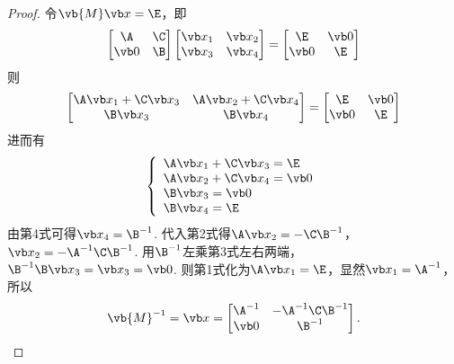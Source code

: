 \begin{example}
\begin{proof}
令\(\vb{M}\x=\E\)，即\[
	\begin{bmatrix}
		\A & \C \\
		\vb0 & \B
	\end{bmatrix}
	\begin{bmatrix}
		\x_1 & \x_2 \\
		\x_3 & \x_4
	\end{bmatrix}
	= \begin{bmatrix}
		\E & \vb0 \\
		\vb0 & \E
	\end{bmatrix}
\]则\[
	\begin{bmatrix}
		\A\x_1+\C\x_3 & \A\x_2+\C\x_4 \\
		\B\x_3 & \B\x_4
	\end{bmatrix}
	= \begin{bmatrix}
		\E & \vb0 \\
		\vb0 & \E
	\end{bmatrix}
\]
进而有\[
	\left\{ \begin{array}{l}
		\A\x_1+\C\x_3 = \E \\
		\A\x_2+\C\x_4 = \vb0 \\
		\B\x_3 = \vb0 \\
		\B\x_4 = \E
	\end{array} \right.
\]
由第4式可得\(\x_4 = \B^{-1}\).
代入第2式得\(\A\x_2=-\C\B^{-1}\)，
\(\x_2=-\A^{-1}\C\B^{-1}\).
用\(\B^{-1}\)左乘第3式左右两端，\(\B^{-1}\B\x_3=\x_3=\vb0\).
则第1式化为\(\A\x_1=\E\)，显然\(\x_1=\A^{-1}\)，所以\[
	\vb{M}^{-1} = \x = \begin{bmatrix}
		\A^{-1} & -\A^{-1}\C\B^{-1} \\
		\vb0 & \B^{-1}
	\end{bmatrix}.
	\qedhere
\]
\end{proof}
\end{example}

